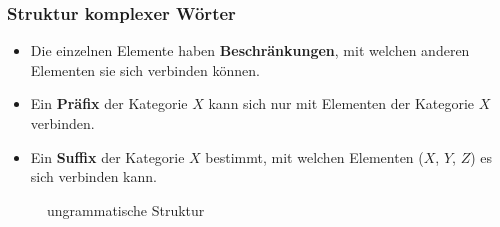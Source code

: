 \begin{frame}
\frametitle{Struktur komplexer Wörter}

\begin{minipage}{.66\textwidth}

\begin{itemize}
	
	\item Die einzelnen Elemente haben \textbf{Beschränkungen}, mit welchen anderen Elementen sie sich verbinden können.
	
	\item Ein \textbf{Präfix} der Kategorie $X$ kann sich nur mit Elementen der Kategorie $X$ verbinden.

	\z 	
	
	\item Ein \textbf{Suffix} der Kategorie $X$ bestimmt, mit welchen Elementen (\zB $X$, $Y$, $Z$) es sich verbinden kann.
	
	\z 
\end{itemize}

\end{minipage}
%
\hfill%
%
\begin{minipage}{.32\textwidth}

\begin{figure}	
\centering
{}
\caption{ungrammatische Struktur}
\end{figure}

\end{minipage}
\end{frame}



